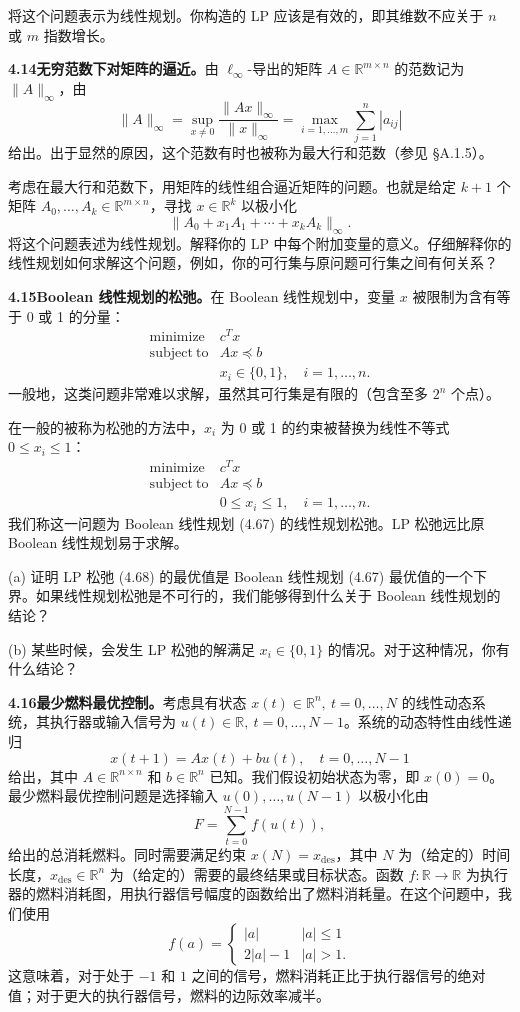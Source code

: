 \documentclass[UTF8, 12pt, fontset=fandol, oneside]{ctexart}
\begin{document}
将这个问题表示为线性规划。你构造的 LP 应该是有效的，即其维数不应关于 $n$ 或 $m$ 指数增长。

\noindent\textbf{4.14\quad 无穷范数下对矩阵的逼近。}\quad 由 $\ell_\infty$-导出的矩阵 $A\in\mathbb{R}^{m\times n}$ 的范数记为 $\|A\|_\infty$，由
\[
\|A\|_\infty=\sup_{x\neq0}\frac{\|Ax\|_\infty}{\|x\|_\infty}=\max_{i=1,\ldots,m}\sum_{j=1}^n |a_{ij}|
\]
给出。出于显然的原因，这个范数有时也被称为最大行和范数（参见 \S A.1.5）。

考虑在最大行和范数下，用矩阵的线性组合逼近矩阵的问题。也就是给定 $k+1$ 个矩阵 $A_0,\ldots,A_k\in\mathbb{R}^{m\times n}$，寻找 $x\in\mathbb{R}^k$ 以极小化
\[
\|A_0+x_1A_1+\cdots+x_kA_k\|_\infty.
\]
将这个问题表述为线性规划。解释你的 LP 中每个附加变量的意义。仔细解释你的线性规划如何求解这个问题，例如，你的可行集与原问题可行集之间有何关系？

\noindent\textbf{4.15\quad Boolean 线性规划的松弛。}\quad 在 Boolean 线性规划中，变量 $x$ 被限制为含有等于 0 或 1 的分量：
\[
\begin{array}{ll}
\mathop{\mathrm{minimize}} & c^Tx\\
\mathrm{subject\ to} & Ax\preceq b\\
& x_i\in\{0,1\},\quad i=1,\ldots,n.
\end{array}
\tag{4.67}
\]
一般地，这类问题非常难以求解，虽然其可行集是有限的（包含至多 $2^n$ 个点）。

在一般的被称为松弛的方法中，$x_i$ 为 0 或 1 的约束被替换为线性不等式 $0\leq x_i\leq1$：
\[
\begin{array}{ll}
\mathop{\mathrm{minimize}} & c^Tx\\
\mathrm{subject\ to} & Ax\preceq b\\
& 0\leq x_i\leq1,\quad i=1,\ldots,n.
\end{array}
\tag{4.68}
\]
我们称这一问题为 Boolean 线性规划 (4.67) 的线性规划松弛。LP 松弛远比原 Boolean 线性规划易于求解。

(a) 证明 LP 松弛 (4.68) 的最优值是 Boolean 线性规划 (4.67) 最优值的一个下界。如果线性规划松弛是不可行的，我们能够得到什么关于 Boolean 线性规划的结论？

(b) 某些时候，会发生 LP 松弛的解满足 $x_i\in\{0,1\}$ 的情况。对于这种情况，你有什么结论？

\noindent\textbf{4.16\quad 最少燃料最优控制。}\quad 考虑具有状态 $x(t)\in\mathbb{R}^n,\ t=0,\ldots,N$ 的线性动态系统，其执行器或输入信号为 $u(t)\in\mathbb{R},\ t=0,\ldots,N-1$。系统的动态特性由线性递归
\[
x(t+1)=Ax(t)+bu(t),\quad t=0,\ldots,N-1
\]
给出，其中 $A\in\mathbb{R}^{n\times n}$ 和 $b\in\mathbb{R}^n$ 已知。我们假设初始状态为零，即 $x(0)=0$。最少燃料最优控制问题是选择输入 $u(0),\ldots,u(N-1)$ 以极小化由
\[
F=\sum_{t=0}^{N-1} f(u(t)),
\]
给出的总消耗燃料。同时需要满足约束 $x(N)=x_{\mathrm{des}}$，其中 $N$ 为（给定的）时间长度，$x_{\mathrm{des}}\in\mathbb{R}^n$ 为（给定的）需要的最终结果或目标状态。函数 $f:\mathbb{R}\to\mathbb{R}$ 为执行器的燃料消耗图，用执行器信号幅度的函数给出了燃料消耗量。在这个问题中，我们使用
\[
f(a)=
\begin{cases}
|a| & |a|\leq1\\
2|a|-1 & |a|>1.
\end{cases}
\]
这意味着，对于处于 $-1$ 和 $1$ 之间的信号，燃料消耗正比于执行器信号的绝对值；对于更大的执行器信号，燃料的边际效率减半。
\end{document}
